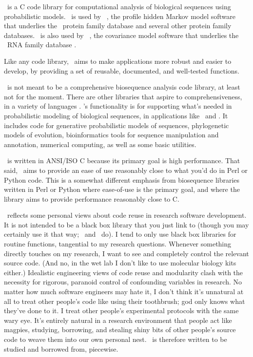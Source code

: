 

\Easel\ is a C code library for computational analysis of biological
sequences using probabilistic models. \Easel\ is used by \HMMER\ 
\citep{hmmer,Eddy98}, the profile hidden Markov model software that
underlies the \Pfam\ protein family database
\citep{Finn06,Sonnhammer97} and several other protein family
databases. \Easel\ is also used by \Infernal\ 
\citep{infernal,NawrockiEddy07}, the covariance model software that
underlies the \Rfam\ RNA family database
\citep{Griffiths-Jones05}. 

Like any code library, \Easel\ aims to make applications more robust
and easier to develop, by providing a set of reusable, documented, and
well-tested functions.

\Easel\ is not meant to be a comprehensive biosequence analysis code
library, at least not for the moment. There are other libraries that
aspire to comprehensiveness, in a variety of languages
\citep{Vahrson96,Pitt01,Mangalam02,Butt05,Dutheil06,Giancarlo07,Doring08}.
\Easel's functionality is for supporting what's needed in
probabilistic modeling of biological sequences, in applications like
\HMMER\ and \Infernal. It includes code for generative probabilistic
models of sequences, phylogenetic models of evolution, bioinformatics
tools for sequence manipulation and annotation, numerical computing,
as well as some basic utilities.

\Easel\ is written in ANSI/ISO C because its primary goal is high
performance. That said, \Easel\ aims to provide an ease of use
reasonably close to what you'd do in Perl or Python code. This is a
somewhat different emphasis from biosequence libraries written in Perl
or Python where ease-of-use is the primary goal, and where the library
aims to provide performance reasonably close to C.

\Easel\ reflects some personal views about code reuse in research
software development.  It is not intended to be a black box library
that you just link to (though you may certainly use it that way;
\HMMER\ and \Infernal\ do). I tend to only use black box libraries for
routine functions, tangential to my research questions. Whenever
something directly touches on my research, I want to see and
completely control the relevant source code. (And no, in the wet lab I
don't like to use molecular biology kits either.)  Idealistic
engineering views of code reuse and modularity clash with the
necessity for rigorous, paranoid control of confounding variables in
research. No matter how much software engineers may hate it, I don't
think it's unnatural at all to treat other people's code like using
their toothbrush; god only knows what they've done to it. I treat
other people's experimental protocols with the same wary eye.  It's
entirely natural in a research environment that people act like
magpies, studying, borrowing, and stealing shiny bits of other
people's source code to weave them into our own personal nest. \Easel\
is therefore written to be studied and borrowed from, piecewise.

